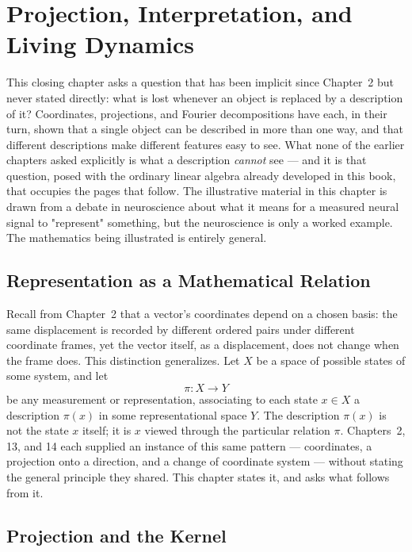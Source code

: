 \chapter{Projection, Interpretation, and Living Dynamics}
\label{ch:ch20-projection-interpretation}

This closing chapter asks a question that has been implicit since
Chapter~2 but never stated directly: what is lost whenever an object is
replaced by a description of it? Coordinates, projections, and Fourier
decompositions have each, in their turn, shown that a single object can be
described in more than one way, and that different descriptions make
different features easy to see. What none of the earlier chapters asked
explicitly is what a description \emph{cannot} see --- and it is that
question, posed with the ordinary linear algebra already developed in this
book, that occupies the pages that follow. The illustrative material in
this chapter is drawn from a debate in neuroscience about what it means
for a measured neural signal to "represent" something, but the
neuroscience is only a worked example. The mathematics being illustrated
is entirely general.

\section{Representation as a Mathematical Relation}

Recall from Chapter~2 that a vector's coordinates depend on a chosen
basis: the same displacement is recorded by different ordered pairs
under different coordinate frames, yet the vector itself, as a
displacement, does not change when the frame does. This distinction
generalizes. Let $X$ be a space of possible states of some system, and let
\[
\pi: X \to Y
\]
be any measurement or representation, associating to each state $x \in X$
a description $\pi(x)$ in some representational space $Y$. The description
$\pi(x)$ is not the state $x$ itself; it is $x$ viewed through the
particular relation $\pi$. Chapters~2, 13, and 14 each supplied an
instance of this same pattern --- coordinates, a projection onto a
direction, and a change of coordinate system --- without stating the
general principle they shared. This chapter states it, and asks what
follows from it.

\section{Projection and the Kernel}

